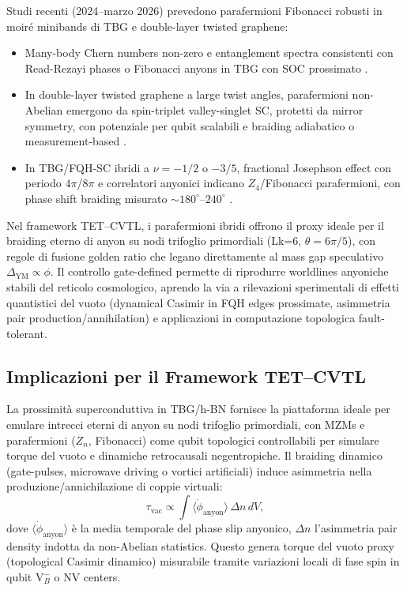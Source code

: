 \documentclass[11pt,a4paper]{article}
\let\oldcite\cite
\renewcommand{\cite}{\protect\oldcite}
\theoremstyle{plain}
\theoremstyle{definition}
\begin{document}
Studi recenti (2024--marzo 2026) prevedono parafermioni Fibonacci robusti in moiré minibands di TBG e double-layer twisted graphene:
\begin{itemize}
    \item Many-body Chern numbers non-zero e entanglement spectra consistenti con Read-Rezayi phases o Fibonacci anyons in TBG con SOC prossimato \cite{AliceaFendley2016, Klinovaja2014, Liu2025}.
    \item In double-layer twisted graphene a large twist angles, parafermioni non-Abelian emergono da spin-triplet valley-singlet SC, protetti da mirror symmetry, con potenziale per qubit scalabili e braiding adiabatico o measurement-based \cite{Zhou2023, Bourrellier2026}.
    \item In TBG/FQH-SC ibridi a $\nu = -1/2$ o $-3/5$, fractional Josephson effect con periodo $4\pi$/$8\pi$ e correlatori anyonici indicano $Z_4$/Fibonacci parafermioni, con phase shift braiding misurato $\sim 180^\circ$--$240^\circ$ \cite{Zeng2023, Liu2025}.
\end{itemize}

Nel framework TET--CVTL, i parafermioni ibridi offrono il proxy ideale per il braiding eterno di anyon su nodi trifoglio primordiali (Lk=6, $\theta = 6\pi/5$), con regole di fusione golden ratio che legano direttamente al mass gap speculativo $\Delta_{\text{YM}} \propto \phi$. Il controllo gate-defined permette di riprodurre worldlines anyoniche stabili del reticolo cosmologico, aprendo la via a rilevazioni sperimentali di effetti quantistici del vuoto (dynamical Casimir in FQH edges prossimate, asimmetria pair production/annihilation) e applicazioni in computazione topologica fault-tolerant.

\subsection{Implicazioni per il Framework TET--CVTL}

La prossimità superconduttiva in TBG/h-BN fornisce la piattaforma ideale per emulare intrecci eterni di anyon su nodi trifoglio primordiali, con MZMs e parafermioni ($Z_n$, Fibonacci) come qubit topologici controllabili per simulare torque del vuoto e dinamiche retrocausali negentropiche. Il braiding dinamico (gate-pulses, microwave driving o vortici artificiali) induce asimmetria nella produzione/annichilazione di coppie virtuali:
\begin{equation}
\tau_{\text{vac}} \propto \int \langle \dot{\phi}_{\text{anyon}} \rangle \, \Delta n \, dV,
\end{equation}
dove $\langle \dot{\phi}_{\text{anyon}} \rangle$ è la media temporale del phase slip anyonico, $\Delta n$ l'asimmetria pair density indotta da non-Abelian statistics. Questo genera torque del vuoto proxy (topological Casimir dinamico) misurabile tramite variazioni locali di fase spin in qubit $\mathrm{V}_B^-$ o NV centers.
\end{document}
